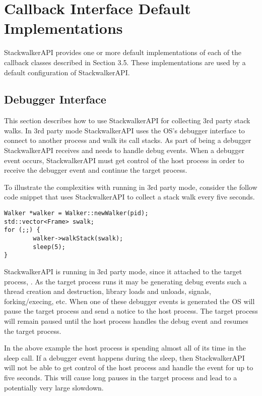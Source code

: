\section{Callback Interface Default Implementations}

StackwalkerAPI provides one or more default implementations of each of the
callback classes described in Section 3.5. These implementations are used by a
default configuration of StackwalkerAPI. 

\subsection{Debugger Interface}
\label{subsec:debugger}

This section describes how to use StackwalkerAPI for collecting 3rd party stack
walks. In 3rd party mode StackwalkerAPI uses the OS's debugger interface to
connect to another process and walk its call stacks. As part of being a debugger
StackwalkerAPI receives and needs to handle debug events. When a debugger event
occurs, StackwalkerAPI must get control of the host process in order to receive
the debugger event and continue the target process. 

To illustrate the complexities with running in 3rd party mode, consider the
follow code snippet that uses StackwalkerAPI to collect a stack walk every five
seconds. 

\begin{lstlisting}
Walker *walker = Walker::newWalker(pid);
std::vector<Frame> swalk;
for (;;) {
		walker->walkStack(swalk);
		sleep(5);
}
\end{lstlisting}

StackwalkerAPI is running in 3rd party mode, since it attached to the target
process, . As the target process runs it may be generating debug events such
a thread creation and destruction, library loads and unloads, signals,
forking/execing, etc. When one of these debugger events is generated the OS will
pause the target process and send a notice to the host process. The target
process will remain paused until the host process handles the debug event and
resumes the target process.

In the above example the host process is spending almost all of its time in the
sleep call. If a debugger event happens during the sleep, then StackwalkerAPI
will not be able to get control of the host process and handle the event for up
to five seconds. This will cause long pauses in the target process and lead to a
potentially very large slowdown.

